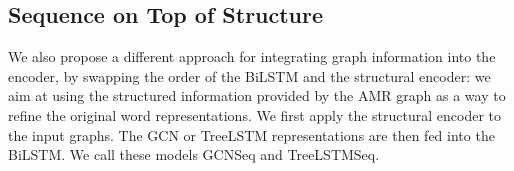 \documentclass[11pt,a4paper]{article}
\begin{document}



\subsection{Sequence on Top of Structure}
\label{sec:bilstmontop}

We also propose a different approach for integrating graph information into the encoder, by swapping the order of the BiLSTM and the structural encoder: we aim at using the structured information provided by the AMR graph as a way to refine the original word representations. We first apply the structural encoder to the input graphs. The GCN or TreeLSTM representations are then fed into the BiLSTM. We call these models {\sc GCNSeq} and {\sc TreeLSTMSeq}. 
\end{document}
